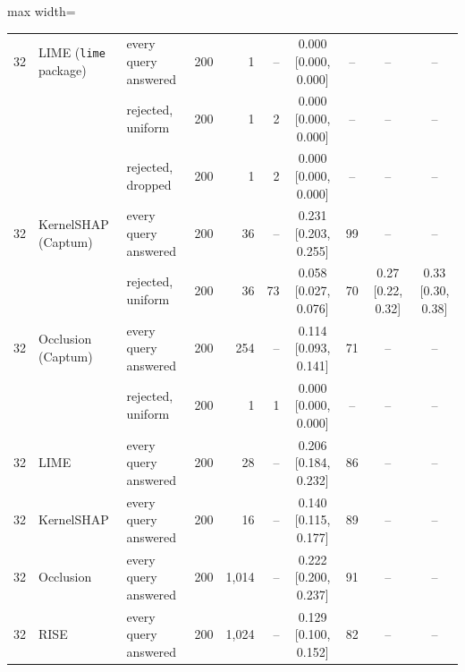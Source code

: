 \begin{table}
\begin{adjustbox}{max width=\textheight}
\begin{tabular}{rllrrrcccc}
32 & LIME (\texttt{lime} package) & every query answered & 200 & 1 & -- & 0.000 {[}0.000, 0.000{]} & -- & -- & -- \\
 &  & rejected, uniform & 200 & 1 & 2 & 0.000 {[}0.000, 0.000{]} & -- & -- & -- \\
 &  & rejected, dropped & 200 & 1 & 2 & 0.000 {[}0.000, 0.000{]} & -- & -- & -- \\
32 & KernelSHAP (Captum) & every query answered & 200 & 36 & -- & 0.231 {[}0.203, 0.255{]} & 99 & -- & -- \\
 &  & rejected, uniform & 200 & 36 & 73 & 0.058 {[}0.027, 0.076{]} & 70 & 0.27 {[}0.22, 0.32{]} & 0.33 {[}0.30, 0.38{]} \\
32 & Occlusion (Captum) & every query answered & 200 & 254 & -- & 0.114 {[}0.093, 0.141{]} & 71 & -- & -- \\
 &  & rejected, uniform & 200 & 1 & 1 & 0.000 {[}0.000, 0.000{]} & -- & -- & -- \\[2pt]
32 & LIME & every query answered & 200 & 28 & -- & 0.206 {[}0.184, 0.232{]} & 86 & -- & -- \\
32 & KernelSHAP & every query answered & 200 & 16 & -- & 0.140 {[}0.115, 0.177{]} & 89 & -- & -- \\
32 & Occlusion & every query answered & 200 & 1{,}014 & -- & 0.222 {[}0.200, 0.237{]} & 91 & -- & -- \\
32 & RISE & every query answered & 200 & 1{,}024 & -- & 0.129 {[}0.100, 0.152{]} & 82 & -- & -- \\
\bottomrule
\end{tabular}
\end{adjustbox}
\end{table}
